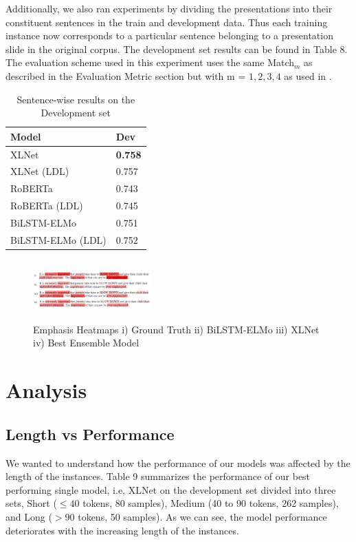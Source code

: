 \documentclass[letterpaper]{article} %
\begin{document}
Additionally, we also ran experiments by dividing the presentations into their constituent sentences in the train and development data. Thus each training instance now corresponds to a particular sentence belonging to a presentation slide in the original corpus. The development set results can be found in Table 8. The evaluation scheme used in this experiment uses the same Match$_m$ as described in the Evaluation Metric section but with  m = \(1,2,3,4\) as used in \citet{shirani2020let}.
\begin{table}[h!]
\centering
\begin{tabular}{|l|l|}
\hline
\textbf{Model} & \textbf{Dev} \\
\hline
XLNet & \textbf{0.758} \\
\hline
XLNet (LDL) & 0.757 \\
\hline
RoBERTa & 0.743 \\
\hline
RoBERTa (LDL) & 0.745 \\
\hline

BiLSTM-ELMo & 0.751 \\
\hline
BiLSTM-ELMo (LDL) & 0.752 \\
\hline

\end{tabular}
\vspace{-0.81mm}
\caption{Sentence-wise results on the Development set}
\label{table:7}
\end{table}


\begin{figure}[h!]
\centering
\includegraphics[width=0.405\textwidth,height=0.91in ]{results_ex.png}
\caption{Emphasis Heatmaps i) Ground Truth ii) BiLSTM-ELMo iii) XLNet iv) Best Ensemble Model}
\label{result_ex}
\end{figure}

\section{Analysis}
\subsection{Length vs Performance}
We wanted to understand how the performance of our models was affected by the length of the instances. Table 9 summarizes the performance of our best performing single model, i.e, XLNet on the development set divided into three sets, Short ($\leq40$ tokens, 80 samples), Medium (40 to 90 tokens, 262 samples), and Long ($>$90 tokens, 50 samples). As we can see, the model performance  deteriorates with the increasing length of the instances.
\end{document}
